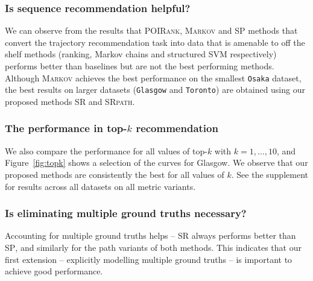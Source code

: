 \subsubsection{Is sequence recommendation helpful?}
We can observe from the results that \textsc{POIRank}, \textsc{Markov} and \textsc{SP}
methods that convert the trajectory recommendation task
into data that is amenable to off the shelf methods (ranking, Markov chains and structured SVM respectively)
performs better than baselines but are not the best performing methods.
Although \textsc{Markov} achieves the best performance on the smallest \texttt{Osaka} dataset,
the best results on larger datasets (\ie \texttt{Glasgow} and \texttt{Toronto}) are obtained using our proposed methods
\textsc{SR} and \textsc{SRpath}.


\subsubsection{The performance in top-$k$ recommendation}
We also compare the performance for all values of top-$k$ with $k=1,\ldots,10$, and
Figure~\ref{fig:topk} shows a selection of the curves for Glasgow. We observe that
our proposed methods are consistently the best for all values of $k$.
See the supplement for results across all datasets on all metric variants.


\subsubsection{Is eliminating multiple ground truths necessary?}
Accounting for multiple ground truths helps --
\textsc{SR} always performs better than \textsc{SP},
and similarly for the {\sc path} variants of both methods.
This indicates that our first extension -- explicitly modelling multiple ground truths
 -- is important to achieve good performance.


